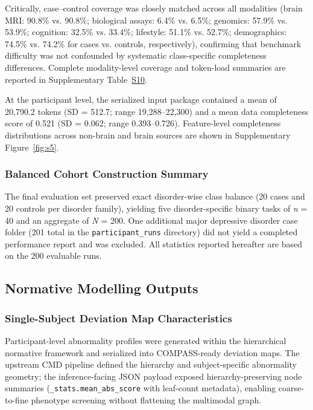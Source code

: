 \documentclass[11pt,a4paper,twoside]{article}
\begin{document}
Critically, case--control coverage was closely matched across all modalities (brain MRI: 90.8\% vs. 90.8\%; biological assays: 6.4\% vs. 6.5\%; genomics: 57.9\% vs. 53.9\%; cognition: 32.5\% vs. 33.4\%; lifestyle: 51.1\% vs. 52.7\%; demographics: 74.5\% vs. 74.2\% for cases vs. controls, respectively), confirming that benchmark difficulty was not confounded by systematic class-specific completeness differences.
Complete modality-level coverage and token-load summaries are reported in Supplementary Table~\hyperref[tab:s10]{S10}.

At the participant level, the serialized input package contained a mean of 20,790.2 tokens (SD = 512.7; range 19,288--22,300) and a mean data completeness score of 0.521 (SD = 0.062; range 0.393--0.726). Feature-level completeness distributions across non-brain and brain sources are shown in Supplementary Figure~\ref{fig:s5}.

\subsubsection{Balanced Cohort Construction Summary}

The final evaluation set preserved exact disorder-wise class balance (20 cases and 20 controls per disorder family), yielding five disorder-specific binary tasks of \textit{n} = 40 and an aggregate of \textit{N} = 200. One additional major depressive disorder case folder (201 total in the \texttt{participant\_{\allowbreak}runs} directory) did not yield a completed performance report and was excluded. All statistics reported hereafter are based on the 200 evaluable runs.

\subsection{Normative Modelling Outputs}

\subsubsection{Single-Subject Deviation Map Characteristics}

Participant-level abnormality profiles were generated within the hierarchical normative framework and serialized into COMPASS-ready deviation maps. The upstream CMD pipeline defined the hierarchy and subject-specific abnormality geometry; the inference-facing JSON payload exposed hierarchy-preserving node summaries (\texttt{\_{\allowbreak}stats.{\allowbreak}mean\_{\allowbreak}abs\_{\allowbreak}score} with leaf-count metadata), enabling coarse-to-fine phenotype screening without flattening the multimodal graph.
\end{document}

